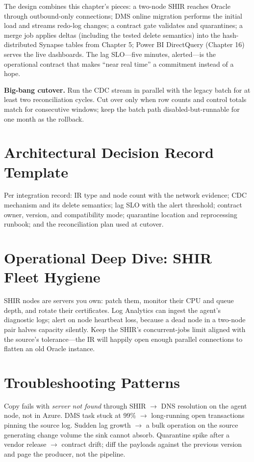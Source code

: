 The design combines this chapter's pieces: a two-node SHIR reaches Oracle through outbound-only connections; DMS online migration performs the initial load and streams redo-log changes; a contract gate validates and quarantines; a merge job applies deltas (including the tested delete semantics) into the hash-distributed Synapse tables from Chapter 5; Power BI DirectQuery (Chapter 16) serves the live dashboards. The lag SLO---five minutes, alerted---is the operational contract that makes ``near real time'' a commitment instead of a hope.

\begin{pitfall}
\textbf{Big-bang cutover.} Run the CDC stream in parallel with the legacy batch for at least two reconciliation cycles. Cut over only when row counts and control totals match for consecutive windows; keep the batch path disabled-but-runnable for one month as the rollback.
\end{pitfall}

\section{Architectural Decision Record Template}
Per integration record: IR type and node count with the network evidence; CDC mechanism and its delete semantics; lag SLO with the alert threshold; contract owner, version, and compatibility mode; quarantine location and reprocessing runbook; and the reconciliation plan used at cutover.

\section{Operational Deep Dive: SHIR Fleet Hygiene}
SHIR nodes are servers you own: patch them, monitor their CPU and queue depth, and rotate their certificates. Log Analytics can ingest the agent's diagnostic logs; alert on node heartbeat loss, because a dead node in a two-node pair halves capacity silently. Keep the SHIR's concurrent-jobs limit aligned with the source's tolerance---the IR will happily open enough parallel connections to flatten an old Oracle instance.

\section{Troubleshooting Patterns}
Copy fails with \emph{server not found} through SHIR $\rightarrow$ DNS resolution on the agent node, not in Azure. DMS task stuck at 99\% $\rightarrow$ long-running open transactions pinning the source log. Sudden lag growth $\rightarrow$ a bulk operation on the source generating change volume the sink cannot absorb. Quarantine spike after a vendor release $\rightarrow$ contract drift; diff the payloads against the previous version and page the producer, not the pipeline.

